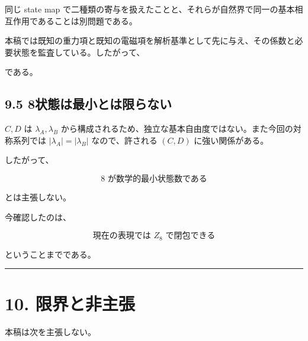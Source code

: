 \documentclass[
  a4paper,
]{ltjsarticle}
\begin{document}
同じ state map
で二種類の寄与を扱えたことと、それらが自然界で同一の基本相互作用であることは別問題である。

本稿では既知の重力項と既知の電磁項を解析基準として先に与え、その係数と必要状態を監査している。したがって、

\begin{center}
\end{center}

である。

\subsection{9.5
8状態は最小とは限らない}\label{ux72b6ux614bux306fux6700ux5c0fux3068ux306fux9650ux3089ux306aux3044}

\(C,D\) は \(\lambda_A,\lambda_B\)
から構成されるため、独立な基本自由度ではない。また今回の対称系列では
\(|\lambda_A|=|\lambda_B|\) なので、許される \((C,D)\)
に強い関係がある。

したがって、

\[
\boxed{
8\text{ が数学的最小状態数である}
}
\]

とは主張しない。

今確認したのは、

\[
\boxed{
\text{現在の表現では }Z_8\text{ で閉包できる}
}
\]

ということまでである。

\begin{center}\rule{0.5\linewidth}{0.5pt}\end{center}

\section{10. 限界と非主張}\label{ux9650ux754cux3068ux975eux4e3bux5f35}

本稿は次を主張しない。
\end{document}
